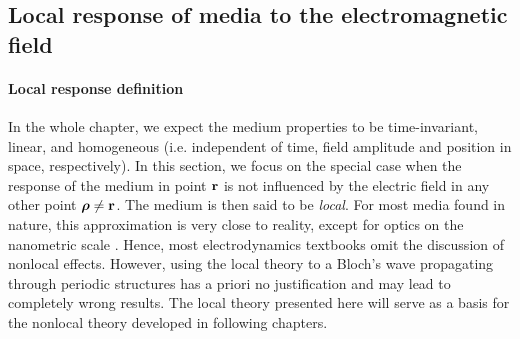 \subsection{Local response of media to the electromagnetic field} \label{loc_response_of_media}
\paragraph{Local response definition} \label{subsection_local_resp} %
In the whole chapter, we expect the medium properties to be time-invariant, linear, and homogeneous (i.e. independent of time, field amplitude and position in space, respectively). 
In this section, we focus on the special case when the response of the medium in point ${\mathbf{r}}$ is not influenced by the electric field in any other point $\boldsymbol{\rho} \neq {\mathbf{r}}$. The medium is then said to be \textit{local}. 
For most media found in nature, this approximation is very close to reality, except for optics on the nanometric scale \cite{wubs2013nonlocal}. Hence, most electrodynamics textbooks omit the discussion of nonlocal effects. However, using the local theory to a Bloch's wave propagating through periodic structures has a priori no justification and may lead to completely wrong results. The local theory presented here will serve as a basis for the nonlocal theory developed in following chapters.

